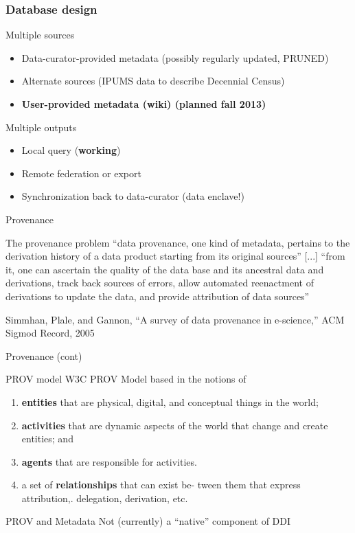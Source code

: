 \begin{frame}
\frametitle{Database design}
\begin{block}{Multiple sources}
\begin{itemize}
\item Data-curator-provided metadata (possibly regularly updated, PRUNED)
\item Alternate sources (IPUMS data to describe Decennial Census)
\item {\bf User-provided metadata (wiki) (planned fall 2013)}
\end{itemize}
\end{block}
\begin{block}{Multiple outputs}
\begin{itemize}
\item Local query ({\bf working})
\item Remote federation or export
\item Synchronization back to data-curator (data enclave!)
\end{itemize}
\end{block}
\end{frame}

\begin{frame}{Provenance}
\begin{block}{The provenance problem}
``data provenance, one kind of metadata, pertains to the derivation history of a
data product starting from its original sources'' [...]  ``from it, one can ascertain
the quality of the data base and its ancestral data and derivations, track back sources
of errors, allow automated reenactment of derivations to update the data, and provide 
attribution of data sources'' 
\end{block}
{\tiny Simmhan, Plale, and Gannon, ``A survey of data provenance in e-science,'' ACM Sigmod Record, 2005}
\end{frame}


\begin{frame}{Provenance (cont)}
\begin{block}{PROV model}
W3C PROV Model  based in the notions of 
\begin{enumerate}
\item \textbf{entities} that are physical, digital, and conceptual
things in the world; 
\item \textbf{activities} that are dynamic aspects of the world that change and
create entities; and 
\item \textbf{agents} that are responsible for activities. 
\item  a set of \textbf{relationships} that can exist be-
tween them that express attribution,. delegation, derivation, etc.
\end{enumerate}
\end{block}
\begin{block}{PROV and Metadata}
Not (currently) a ``native'' component of DDI
\end{block}
\end{frame}

